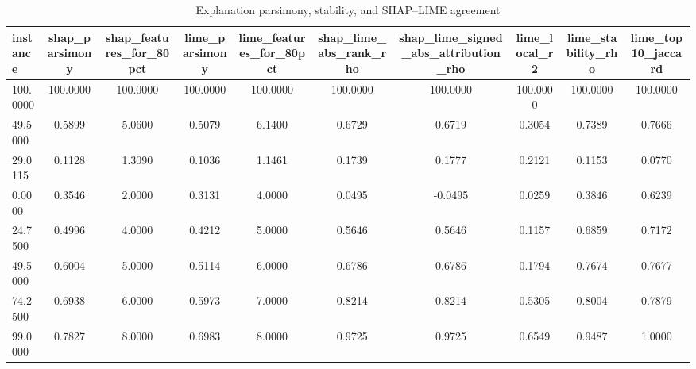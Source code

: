 \begin{table}
\centering
\caption{Explanation parsimony, stability, and SHAP--LIME agreement}
\label{tab:explanation_quality}
\begin{tabular}{lccccccccc}
\toprule
instance & shap_parsimony & shap_features_for_80pct & lime_parsimony & lime_features_for_80pct & shap_lime_abs_rank_rho & shap_lime_signed_abs_attribution_rho & lime_local_r2 & lime_stability_rho & lime_top10_jaccard \\
\midrule
100.0000 & 100.0000 & 100.0000 & 100.0000 & 100.0000 & 100.0000 & 100.0000 & 100.0000 & 100.0000 & 100.0000 \\
49.5000 & 0.5899 & 5.0600 & 0.5079 & 6.1400 & 0.6729 & 0.6719 & 0.3054 & 0.7389 & 0.7666 \\
29.0115 & 0.1128 & 1.3090 & 0.1036 & 1.1461 & 0.1739 & 0.1777 & 0.2121 & 0.1153 & 0.0770 \\
0.0000 & 0.3546 & 2.0000 & 0.3131 & 4.0000 & 0.0495 & -0.0495 & 0.0259 & 0.3846 & 0.6239 \\
24.7500 & 0.4996 & 4.0000 & 0.4212 & 5.0000 & 0.5646 & 0.5646 & 0.1157 & 0.6859 & 0.7172 \\
49.5000 & 0.6004 & 5.0000 & 0.5114 & 6.0000 & 0.6786 & 0.6786 & 0.1794 & 0.7674 & 0.7677 \\
74.2500 & 0.6938 & 6.0000 & 0.5973 & 7.0000 & 0.8214 & 0.8214 & 0.5305 & 0.8004 & 0.7879 \\
99.0000 & 0.7827 & 8.0000 & 0.6983 & 8.0000 & 0.9725 & 0.9725 & 0.6549 & 0.9487 & 1.0000 \\
\bottomrule
\end{tabular}
\end{table}
